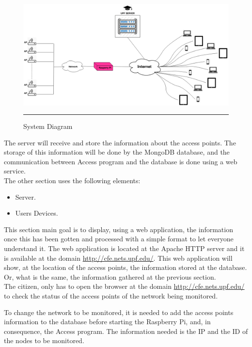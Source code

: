 \documentclass[12pt, a4paper,twoside]{tesi_upf}
\begin{document}
        \begin{figure}[htbp]
          \centering
              \includegraphics[scale=0.42,angle=90]{./figures/arq.png}
              \rule{32em}{0.5pt}
            \caption[System Diagram]{System Diagram}
            \label{fig:arq}
        \end{figure}
        
        The server will receive and store the information about the access points. The storage of this information will be done by the MongoDB database, and the communication between Access program and the database is done using a web service.\\
        
        The other section uses the following elements:
          \begin{itemize}
            \item Server.
            \item Users Devices.
        \end{itemize}
        
        This section main goal is to display, using a web application, the information once this has been gotten and processed with a simple format to let everyone understand it. The web application is located at the Apache HTTP server and it is available at the domain \url{http://cfe.nets.upf.edu/}. This web application will show, at the location of the access points, the information stored at the database. Or, what is the same, the information gathered at the previous section.\\
        
        The citizen, only has to open the browser at the domain \url{http://cfe.nets.upf.edu/} to check the status of the access points of the network being monitored.
        
        To change the network to be monitored, it is needed to add the  access points information to the database before starting the Raspberry Pi, and, in consequence, the Access program. The information needed is the IP and the ID of the nodes to be monitored.
        
\end{document}
